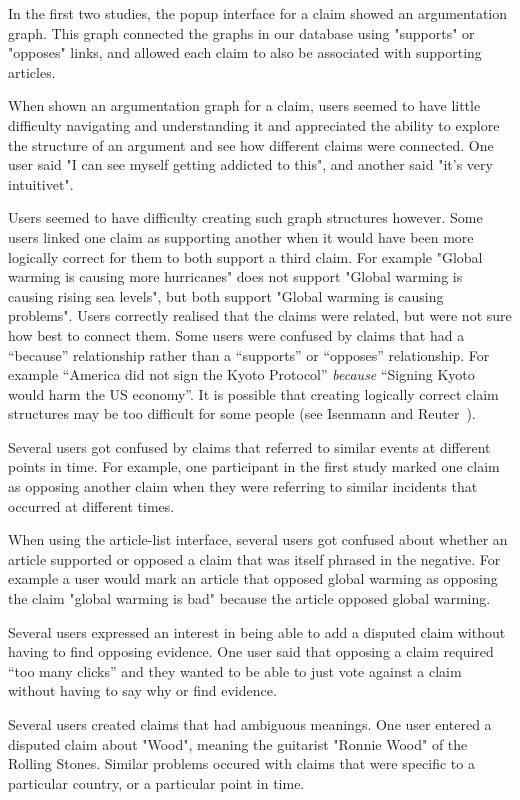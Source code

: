 \documentclass{www2010-submission}
\begin{document}
In the first two studies, the popup interface for a claim showed an argumentation graph. This graph connected the graphs in our database using "supports" or "opposes" links, and allowed each claim to also be associated with supporting articles. 

When shown an argumentation graph for a claim, users seemed to have little difficulty navigating and understanding it and appreciated the ability to explore the structure of an argument and see how different claims were connected. One user said "I can see myself getting addicted to this", and another said "it's very intuitivet".

Users seemed to have difficulty creating such graph structures however. Some users linked one claim as supporting another when it would have been more logically correct for them to both support a third claim. For example "Global warming is causing more hurricanes" does not support "Global warming is causing rising sea levels", but both support "Global warming is causing problems". Users correctly realised that the claims were related, but were not sure how best to connect them. Some users were confused by claims that had a ``because'' relationship rather than a ``supports'' or ``opposes'' relationship. For example ``America did not sign the Kyoto Protocol'' {\it because} ``Signing Kyoto would harm the US economy''. It is possible that creating logically correct claim structures may be too difficult for some people (see Isenmann and Reuter~\cite{Isenmann1997}).

Several users got confused by claims that referred to similar events at different points in time. For example, one participant in the first study marked one claim as opposing another claim when they were referring to similar incidents that occurred at different times. 

When using the article-list interface, several users got confused about whether an article supported or opposed a claim that was itself phrased in the negative. For example a user would mark an article that opposed global warming as opposing the claim "global warming is bad" because the article opposed global warming.

Several users expressed an interest in being able to add a disputed claim without having to find opposing evidence. One user said that opposing a claim required ``too many clicks'' and they wanted to be able to just vote against a claim without having to say why or find evidence. 

Several users created claims that had ambiguous meanings. One user entered a disputed claim about "Wood", meaning the guitarist "Ronnie Wood" of the Rolling Stones. Similar problems occured with claims that were specific to a particular country, or a particular point in time. 
\end{document}
